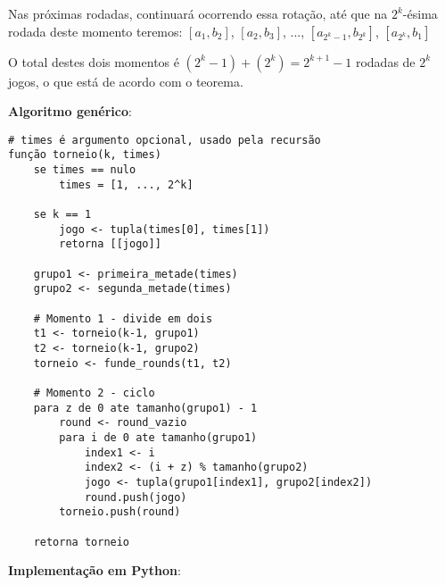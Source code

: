 \documentclass{article}
\begin{document}
Nas próximas rodadas, continuará ocorrendo essa rotação, até que na $2^k$-ésima rodada deste momento teremos: $[a_1, b_2]$, $[a_2, b_3]$, ..., $[a_{2^k-1}, b_{2^k}]$, $[a_{2^k}, b_1]$

O total destes dois momentos é $(2^k -1) + (2^k) = 2^{k+1} - 1$ rodadas de $2^k$ jogos, o que está de acordo com o teorema.


\textbf{Algoritmo genérico}:

{\color{ogreen}
\begin{verbatim}
# times é argumento opcional, usado pela recursão
função torneio(k, times)
    se times == nulo
        times = [1, ..., 2^k]

    se k == 1
        jogo <- tupla(times[0], times[1])
        retorna [[jogo]]

    grupo1 <- primeira_metade(times)
    grupo2 <- segunda_metade(times)

    # Momento 1 - divide em dois
    t1 <- torneio(k-1, grupo1)
    t2 <- torneio(k-1, grupo2)
    torneio <- funde_rounds(t1, t2)

    # Momento 2 - ciclo
    para z de 0 ate tamanho(grupo1) - 1
        round <- round_vazio
        para i de 0 ate tamanho(grupo1)
            index1 <- i
            index2 <- (i + z) % tamanho(grupo2)
            jogo <- tupla(grupo1[index1], grupo2[index2])
            round.push(jogo)
        torneio.push(round)

    retorna torneio
\end{verbatim}
}


\textbf{Implementação em Python}:
\end{document}
